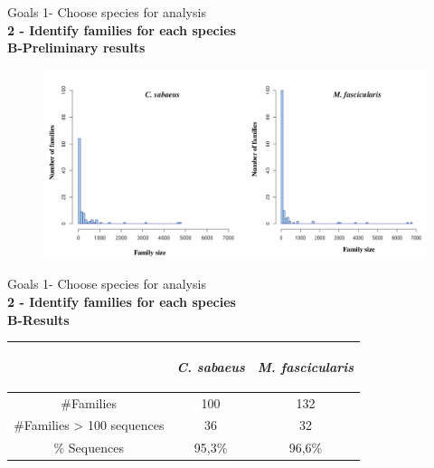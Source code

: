 \documentclass[11pt]{beamer}
\begin{document}
\begin{frame}{Goals}
	1- Choose species for analysis \\ \medbreak
	\textbf{2 - Identify families for each species } \\ \medbreak
	\textbf{B-Preliminary results}	
	\begin{figure}
		\includegraphics[width=\textwidth]{img/FamSize_NumFam.png}
	\end{figure}	
\end{frame}

\begin{frame}{Goals}
	1- Choose species for analysis \\ \medbreak
	\textbf{2 - Identify families for each species } \\ \medbreak
	\textbf{B-Results}

\begin{center}
			\medbreak						
			\begin{tabular}{|c|c|c|}
			\hline
			\begin{bf}\end{bf} & \begin{bf}\textit{C. sabaeus}\end{bf} & \begin{bf}\textit{M. fascicularis}\end{bf}\\
			\hline
			\#Families & 100 & 132\\
			\hline
			\#Families > 100 sequences  & 36 & 32 \\
			\hline
			\% Sequences  & 95,3\% & 96,6\% \\
			\hline
			\end{tabular}			
		\end{center}
\end{frame}
\end{document}
